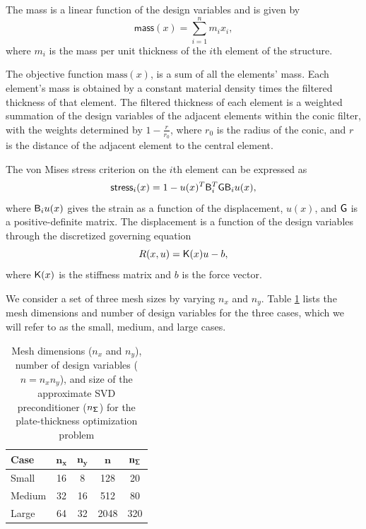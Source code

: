 The mass is a linear function
of the design variables and is given by
\begin{equation*}
  \textsf{mass}(x) = \sum_{i=1}^{n} m_i x_i,
\end{equation*}
where $m_i$ is the mass per unit thickness of the $i$th element of the
structure.

The objective function $\text{mass}(x)$, is a sum of all the elements' mass. 
Each element's mass is obtained by a constant material density times the filtered thickness of that element. 
The filtered thickness of each element is a weighted summation of the design variables 
of the adjacent elements within the conic filter, with the weights determined by 
$1-\frac{r}{r_0}$,  where $r_0$ is the radius of the conic, and $r$ is the distance 
of the adjacent element to the central element.  


The von Mises stress
criterion on the $i$th element can be expressed as
\begin{equation*}
  \textsf{stress}_i(x) = 1 - u(x)^T \mathsf{B}_i^T \mathsf{G} \mathsf{B}_i u(x),
\end{equation*}
where $\mathsf{B}_i u(x)$ gives the strain as a function of the displacement,
$u(x)$, and $\mathsf{G}$ is a positive-definite matrix.  The displacement is a
function of the design variables through the discretized governing equation
\begin{equation*}
  R(x,u) = \mathsf{K}(x) u - b,
\end{equation*}
where $\mathsf{K}(x)$ is the stiffness matrix and $b$ is the force vector.

We consider a set of three mesh sizes by varying $n_x$ and $n_y$.  Table
\ref{tab:mesh_sizes} lists the mesh dimensions and number of design variables
for the three cases, which we will refer to as the small, medium, and large
cases.

\begin{table}[tbp]
  \begin{center}
    \caption{Mesh dimensions ($n_x$ and $n_y$), number of design variables ($n =
      n_x n_y$), and size of the approximate SVD preconditioner
      ($n_{\mathsf{\Sigma}}$) for the plate-thickness optimization
      problem \label{tab:mesh_sizes}}
  \begin{tabular}{ l c c c c}
    \textbf{Case} & $\mathbf{n_x}$  & $\mathbf{n_y}$ & $\mathbf{n}$
    & $\mathbf{{n_{\mathsf{\Sigma}}}}$
    \\ \hline
    \rule{0ex}{3ex}%
    Small  &   16 & 8  & 128  & 20 \\ 
    Medium &   32 & 16 & 512  & 80 \\  
    Large  &   64 & 32 & 2048 & 320  
  \end{tabular}
  \end{center}
\end{table}

